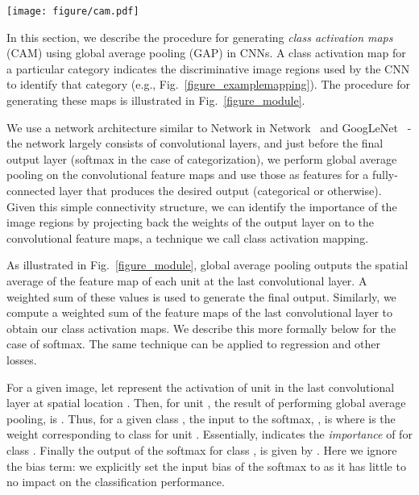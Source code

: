 \documentclass[10pt,twocolumn,letterpaper]{article}
\begin{document}
\begin{figure*}
\texttt{[image: figure/cam.pdf]}
 \caption{Class Activation Mapping: the predicted class score is mapped back to the previous convolutional layer to generate the class activation maps (CAMs). The CAM highlights the class-specific discriminative regions.}\label{figure_module}
\end{figure*}

In this section, we describe the procedure for generating \textit{class activation maps} (CAM) using global average pooling (GAP) in CNNs. A class activation map for a particular category indicates the discriminative image regions used by the CNN to identify that category (e.g., Fig.~\ref{figure_examplemapping}). The procedure for generating these maps is illustrated in Fig.~\ref{figure_module}.

We use a network architecture similar to Network in Network~\cite{lin2013network} and GoogLeNet~\cite{szegedy2014going} - the network largely consists of convolutional layers, and just before the final output layer (softmax in the case of categorization), we perform global average pooling on the convolutional feature maps and use those as features for a fully-connected layer that produces the desired output (categorical or otherwise). Given this simple connectivity structure, we can identify the importance of the image regions by projecting back the weights of the output layer on to the convolutional feature maps, a technique we call class activation mapping.



As illustrated in Fig.~\ref{figure_module}, global average pooling outputs the spatial average of the feature map of each unit at the last convolutional layer. A weighted sum of these values is used to generate the final output. Similarly, we  compute a weighted sum of the feature maps of the last convolutional layer to obtain our class activation maps. We describe this more formally below for the case of softmax. The same technique can be applied to regression and other losses.



For a given image, let  represent the activation of unit  in the last convolutional layer at spatial location . Then, for unit , the result of performing global average pooling,  is . Thus, for a given class , the input to the softmax, , is  where  is the weight corresponding to class  for unit . Essentially,  indicates the \textit{importance} of  for class . Finally the output of the softmax for class ,  is given by . Here we ignore the bias term: we explicitly set the input bias of the softmax to  as it has little to no impact on the classification performance.
\end{document}
